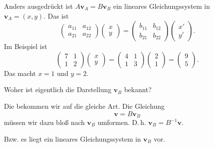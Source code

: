 \documentclass[9pt]{beamer}
\newcommand{\bv}[1]{\mathbf{#1}}
\begin{document}
\begin{frame}
Anders ausgedrückt ist $A\bv v_A = B\bv v_B$ ein lineares
Gleichungssystem in $\bv v_A=(x,y)$.\pause{} Das ist
\[\begin{pmatrix}a_{11} & a_{12}\\ a_{21} & a_{22}\end{pmatrix}\begin{pmatrix}x\\ y\end{pmatrix}
= \begin{pmatrix}b_{11} & b_{12}\\ b_{21} & b_{22}\end{pmatrix}\begin{pmatrix}x'\\ y'\end{pmatrix}.
\]\pause{}
Im Beispiel ist
\[\begin{pmatrix}7 & 1\\ 1 & 2\end{pmatrix}\begin{pmatrix}x\\ y\end{pmatrix}
= \begin{pmatrix}4 & 1\\ 1 & 3\end{pmatrix}\begin{pmatrix}2\\ 1\end{pmatrix}
= \begin{pmatrix}9\\ 5\end{pmatrix}.\]\pause
Das macht $x=1$ und $y=2$.
\end{frame}

\begin{frame}
Woher ist eigentlich die Darstellung $\bv v_B$ bekannt?\pause

\vspace{0.8em}
Die bekommen wir auf die gleiche Art.  Die Gleichung
\[\bv v = B\bv v_B\]
müssen wir dazu bloß nach $\bv v_B$ umformen. D.\,h.
$\bv v_B = B^{-1}\bv v$.\pause

\vspace{0.8em}
Bzw. es liegt ein lineares Gleichungssystem
in $\bv v_B$ vor.
\end{frame}
\end{document}
